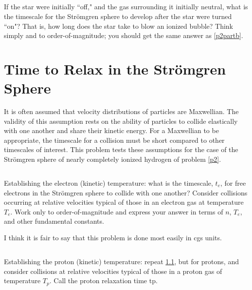 \documentclass[11pt]{article}
\def\Te{{T_e}}
\def\Tp{{T_p}}
\begin{document}
\subsection{}

If the star were initially ``off," and the gas surrounding it initially neutral,
what is the timescale for the Str\"omgren sphere to develop after the star were
turned ``on"? That is, how long does the star take to blow an ionized bubble?
Think simply and to order-of-magnitude; you should get the same answer as \ref{p2partb}.

\section{Time to Relax in the Str\"omgren Sphere}

It is often assumed that velocity distributions of particles are Maxwellian.
The validity of this assumption rests on the ability of particles to collide
elastically with one another and share their kinetic energy. For a Maxwellian
to be appropriate, the timescale for a collision must be short compared to
other timescales of interest. This problem tests these assumptions for the case
of the Str\"omgren sphere of nearly completely ionized hydrogen of problem \ref{p2}.

\subsection{}\label{p3parta}

Establishing the electron (kinetic) temperature: what is the timescale, $t_e$, for
free electrons in the Str\"omgren sphere to collide with one another? Consider
collisions occurring at relative velocities typical of those in an electron
gas at temperature $\Te$. Work only to order-of-magnitude and express your answer
in terms of $n$, $\Te$, and other fundamental constants.

I think it is fair to say that this problem is done most easily in cgs units.

\subsection{}\label{p3partb}

Establishing the proton (kinetic) temperature: repeat \ref{p3parta}, but for
protons, and consider collisions at relative velocities typical of those in a
proton gas of temperature $\Tp$. Call the proton relaxation time tp.
\end{document}
